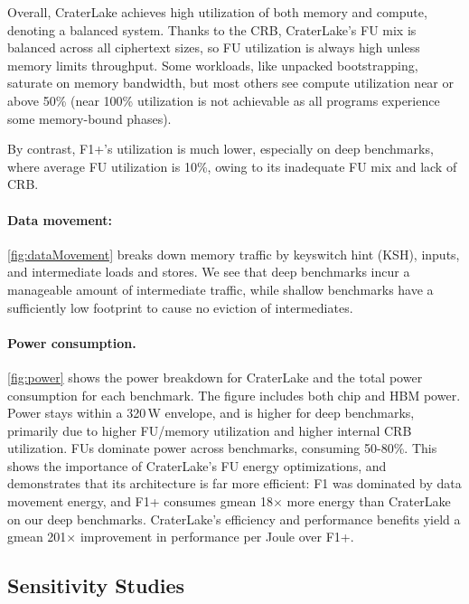 Overall, CraterLake achieves high utilization of both memory and compute,
denoting a balanced system. Thanks to the CRB, CraterLake's FU mix is balanced
across all ciphertext sizes, so FU utilization is always high unless memory
limits throughput. Some workloads, like unpacked bootstrapping, saturate on
memory bandwidth, but most others see compute utilization near or above 50\%
(near 100\% utilization is not achievable as all programs experience some
memory-bound phases).

By contrast, F1+'s utilization is much lower, especially on deep benchmarks,
where average FU utilization is 10\%, owing to its inadequate FU mix and lack
of CRB.

\figDataMovementAndPower

\paragraph{Data movement:} \autoref{fig:dataMovement}
breaks down memory traffic by keyswitch hint (KSH), inputs, and intermediate
loads and stores. We see that deep benchmarks incur a manageable amount of
intermediate traffic, while shallow benchmarks have a sufficiently low
footprint to cause no eviction of intermediates.

\paragraph{Power consumption.}
\autoref{fig:power} shows the power breakdown for CraterLake and the total
power consumption for each benchmark. The figure includes both chip and HBM
power. Power stays within a 320\,W envelope, and is higher for deep benchmarks,
primarily due to higher FU/memory utilization and higher internal CRB
utilization. FUs dominate power across benchmarks, consuming 50-80\%. This
shows the importance of CraterLake's FU energy optimizations, and demonstrates
that its architecture is far more efficient: F1 was dominated by data movement
energy, and F1+ consumes gmean 18$\times$ more energy than CraterLake on our
deep benchmarks. CraterLake's efficiency and performance benefits yield a gmean
201$\times$ improvement in performance per Joule over F1+.

\subsection{Sensitivity Studies}
\label{sec:sensitivity}

\figGmeanVsStorage

